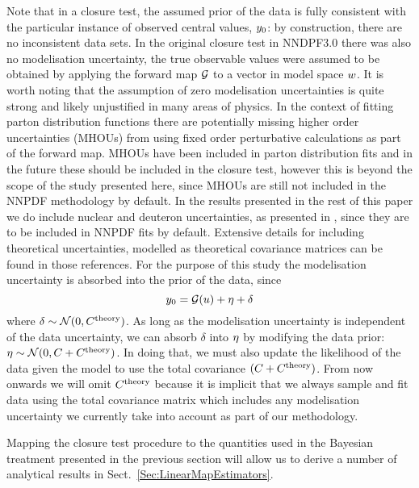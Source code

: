 Note that in a closure test, the assumed prior of the data is fully consistent
with the particular instance of observed central values, $y_0$: by
construction, there are no inconsistent data sets. In the original closure test
in NNDPF3.0 there was also no modelisation uncertainty, the true observable
values were assumed to be obtained by applying the forward map $\mathcal{G}$ to a
vector in model space $w$. It is worth noting that the assumption of
zero modelisation uncertainties is quite strong and likely unjustified in many
areas of physics. In the context of fitting parton distribution functions there
are potentially missing higher order uncertainties (MHOUs) from using fixed
order perturbative calculations as part of the forward map. MHOUs have been
included in parton distribution fits \cite{AbdulKhalek:2019ihb} and in the
future these should be included in the closure test, however this is beyond the
scope of the study presented here, since MHOUs are still not included in the
NNPDF methodology by default. In the results presented in the rest of this paper
we do include nuclear and deuteron uncertainties, as presented in
\cite{Ball:2018twp, Ball:2020xqw}, since they are to be included in NNPDF fits
by default. Extensive details for including theoretical uncertainties, modelled
as theoretical covariance matrices can be found in those references. For the
purpose of this study the modelisation uncertainty is absorbed into the prior of
the data, since
\begin{equation}
    y_0 = \mathcal{G}(u) + \eta + \delta
\end{equation}
where $\delta \sim \mathcal{N}(0, C^{\rm theory})$. As long as the
modelisation uncertainty is independent of the data uncertainty, we can absorb
$\delta$ into $\eta$ by modifying the data prior: $\eta \sim
\mathcal{N}(0, C + C^{\rm theory})$. In doing that, we must also update the
likelihood of the data given the model to use the total covariance $(C + C^{\rm
theory})$. From now onwards we will omit $C^{\rm theory}$ because it is implicit
that we always sample and fit data using the total covariance matrix which
includes any modelisation uncertainty we currently take into account as part of
our methodology.

Mapping the closure test procedure to the quantities used in the Bayesian
treatment presented in the previous section will allow us to derive a number of
analytical results in Sect.~\ref{Sec:LinearMapEstimators}.